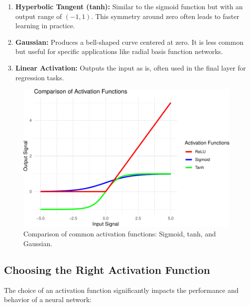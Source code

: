 \documentclass[
]{book}
\providecommand{\tightlist}{%
  \setlength{\itemsep}{0pt}\setlength{\parskip}{0pt}}
\theoremstyle{definition}
\theoremstyle{definition}
\theoremstyle{definition}
\theoremstyle{definition}
\theoremstyle{remark}
\begin{document}
\begin{enumerate}
\def\labelenumi{\arabic{enumi}.}
\tightlist
\item
  \textbf{Hyperbolic Tangent (tanh):} Similar to the sigmoid function but with an output range of \((-1, 1)\). This symmetry around zero often leads to faster learning in practice.\\
\item
  \textbf{Gaussian:} Produces a bell-shaped curve centered at zero. It is less common but useful for specific applications like radial basis function networks.\\
\item
  \textbf{Linear Activation:} Outputs the input as is, often used in the final layer for regression tasks.
\end{enumerate}

\begin{figure}

{\centering \includegraphics[width=0.8\linewidth]{nn_files/figure-latex/active-fun-comparison-1} 

}

\caption{Comparison of common activation functions: Sigmoid, tanh, and Gaussian.}\label{fig:active-fun-comparison}
\end{figure}

\subsection*{Choosing the Right Activation Function}\label{choosing-the-right-activation-function}

The choice of an activation function significantly impacts the performance and behavior of a neural network:
\end{document}
